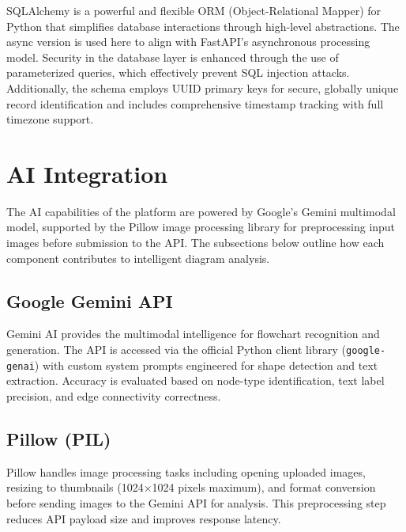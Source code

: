 SQLAlchemy is a powerful and flexible ORM (Object-Relational 
Mapper) for Python that simplifies database interactions through 
high-level abstractions. The async version is used here to align 
with FastAPI's asynchronous processing model. Security in the database layer is enhanced through the use of parameterized queries, which effectively prevent SQL injection attacks. Additionally, the schema employs UUID primary keys for secure, globally unique record identification and includes comprehensive timestamp tracking with full timezone support.

\section{AI Integration}
\label{sec:ai-integration}

The AI capabilities of the platform are powered by Google's 
Gemini multimodal model, supported by the Pillow image 
processing library for preprocessing input images before 
submission to the API. The subsections below outline how each 
component contributes to intelligent diagram 
analysis.

\subsection{Google Gemini API}
\label{subsec:gemini}

Gemini AI provides the multimodal intelligence for flowchart recognition and generation. The API is accessed via the official Python client library (\texttt{google-genai}) with custom system prompts engineered for shape detection and text extraction. Accuracy is evaluated based on node-type identification, text label precision, and edge connectivity correctness.~

\subsection{Pillow (PIL)}
\label{subsec:pillow}

Pillow handles image processing tasks including opening uploaded 
images, resizing to thumbnails (1024$\times$1024 pixels 
maximum), and format conversion before sending images to the 
Gemini API for analysis. This preprocessing step reduces API 
payload size and improves response latency.

